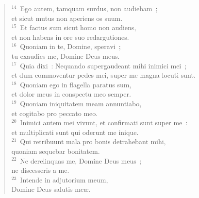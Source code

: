 \begin{flushleft}
\begin{verse}
${}^{14}$~Ego autem, tamquam surdus, non audiebam~;\\ et sicut mutus non aperiens os suum.\\
${}^{15}$~Et factus sum sicut homo non audiens,\\ et non habens in ore suo redargutiones.\\
${}^{16}$~Quoniam in te, Domine, speravi~;\\ tu exaudies me, Domine Deus meus.\\
${}^{17}$~Quia dixi~: Nequando supergaudeant mihi inimici mei~;\\ et dum commoventur pedes mei, super me magna locuti sunt.\\
${}^{18}$~Quoniam ego in flagella paratus sum,\\ et dolor meus in conspectu meo semper.\\
${}^{19}$~Quoniam iniquitatem meam annuntiabo,\\ et cogitabo pro peccato meo.\\
${}^{20}$~Inimici autem mei vivunt, et confirmati sunt super me~:\\ et multiplicati sunt qui oderunt me inique.\\
${}^{21}$~Qui retribuunt mala pro bonis detrahebant mihi,\\ quoniam sequebar bonitatem.\\
${}^{22}$~Ne derelinquas me, Domine Deus meus~;\\ ne discesseris a me.\\
${}^{23}$~Intende in adjutorium meum,\\ Domine Deus salutis me\ae .\end{verse}\end{flushleft}


